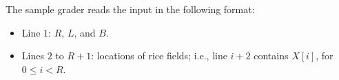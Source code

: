 The sample grader reads the input in the following format:
\begin{itemize}
\item Line $1$: $R$, $L$, and $B$.
\item Lines $2$ to $R+1$: locations of rice fields; i.e., line $i+2$ contains $X[i]$, for $0 \le i < R$.
\end{itemize}
